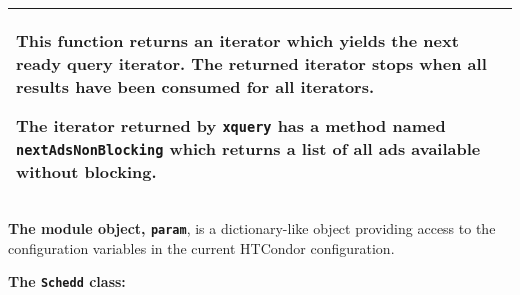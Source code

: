 \begin{flushleft}
\begin{longtable}{|p{16cm}|}
This function returns an iterator which yields the next ready query iterator.  The
returned iterator stops when all results have been consumed for all iterators.

The iterator returned by \texttt{xquery} has a method named \texttt{nextAdsNonBlocking}
which returns a list of all ads available without blocking.

\\ \hline

\end{longtable}
\end{flushleft}

\textbf{The module object, \texttt{param}}, is
a dictionary-like object providing access to the configuration variables
in the current HTCondor configuration.

\textbf{The \texttt{Schedd} class:}
